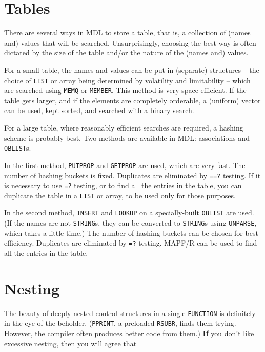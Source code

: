 \documentclass[a4paper]{scrbook}
\begin{document}
\section{Tables}\label{tables}

There are several ways in MDL to store a table, that is, a collection of (names and) values that will be searched.
Unsurprisingly, choosing the best way is often dictated by the size of the table and/or the nature of the (names and)
values.

For a small table, the names and values can be put in (separate) structures -- the choice of \texttt{LIST} or array being
determined by volatility and limitability -- which are searched using \texttt{MEMQ} or \texttt{MEMBER}. This method is very
space-efficient. If the table gets larger, and if the elements are completely orderable, a (uniform) vector can be used,
kept sorted, and searched with a binary search.

For a large table, where reasonably efficient searches are required, a hashing scheme is probably best. Two methods are
available in MDL: associations and \texttt{OBLIST}s.

In the first method, \texttt{PUTPROP} and \texttt{GETPROP} are used, which are very fast. The number of hashing buckets is
fixed. Duplicates are eliminated by \texttt{==?} testing. If it is necessary to use \texttt{=?} testing, or to find all the
entries in the table, you can duplicate the table in a \texttt{LIST} or array, to be used only for those purposes.

In the second method, \texttt{INSERT} and \texttt{LOOKUP} on a specially-built \texttt{OBLIST} are used. (If the names are
not \texttt{STRING}s, they can be converted to \texttt{STRING}s using \texttt{UNPARSE}, which takes a little time.) The
number of hashing buckets can be chosen for best efficiency. Duplicates are eliminated by \texttt{=?} testing. MAPF/R can
be used to find all the entries in the table.

\section{Nesting}\label{nesting}

The beauty of deeply-nested control structures in a single \texttt{FUNCTION} is definitely in the eye of the beholder.
(\texttt{PPRINT}, a preloaded \texttt{RSUBR}, finds them trying. However, the compiler often produces better code from
them.) \textbf{If} you don't like excessive nesting, then you will agree that
\end{document}
